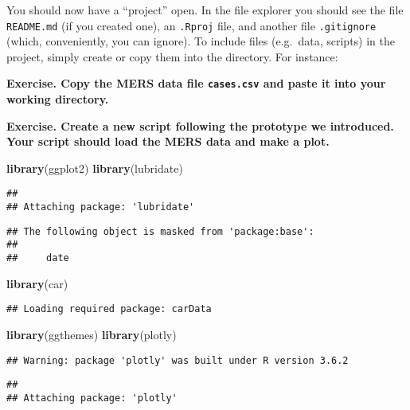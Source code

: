 \documentclass[]{article}
\newenvironment{Shaded}{\begin{snugshade}}{\end{snugshade}}
\newcommand{\KeywordTok}[1]{\textcolor[rgb]{0.13,0.29,0.53}{\textbf{#1}}}
\newcommand{\NormalTok}[1]{#1}
\begin{document}
You should now have a ``project'' open. In the file explorer you should
see the file \texttt{README.md} (if you created one), an \texttt{.Rproj}
file, and another file \texttt{.gitignore} (which, conveniently, you can
ignore). To include files (e.g.~data, scripts) in the project, simply
create or copy them into the directory. For instance:

\textbf{Exercise. Copy the MERS data file \texttt{cases.csv} and paste
it into your working directory.}

\textbf{Exercise. Create a new script following the prototype we
introduced. Your script should load the MERS data and make a plot.}

\begin{Shaded}
\begin{Highlighting}[]
\KeywordTok{library}\NormalTok{(ggplot2)}
\KeywordTok{library}\NormalTok{(lubridate)}
\end{Highlighting}
\end{Shaded}

\begin{verbatim}
## 
## Attaching package: 'lubridate'
\end{verbatim}

\begin{verbatim}
## The following object is masked from 'package:base':
## 
##     date
\end{verbatim}

\begin{Shaded}
\begin{Highlighting}[]
\KeywordTok{library}\NormalTok{(car)}
\end{Highlighting}
\end{Shaded}

\begin{verbatim}
## Loading required package: carData
\end{verbatim}

\begin{Shaded}
\begin{Highlighting}[]
\KeywordTok{library}\NormalTok{(ggthemes)}
\KeywordTok{library}\NormalTok{(plotly)}
\end{Highlighting}
\end{Shaded}

\begin{verbatim}
## Warning: package 'plotly' was built under R version 3.6.2
\end{verbatim}

\begin{verbatim}
## 
## Attaching package: 'plotly'
\end{verbatim}
\end{document}
